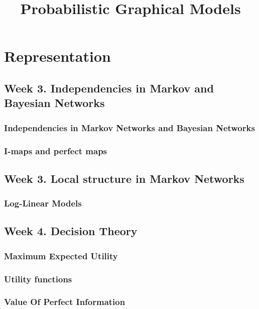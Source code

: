 \documentclass[a4paper,10pt]{article}
\title{Probabilistic Graphical Models}
\author{}
\begin{document}
\maketitle

\section{Representation}

\subsection{Week 3. Independencies in Markov and Bayesian Networks}

\subsubsection{Independencies in Markov Networks and Bayesian Networks}



\subsubsection{I-maps and perfect maps}



\subsection{Week 3. Local structure in Markov Networks}

\subsubsection{Log-Linear Models}




\subsection{Week 4. Decision Theory}

\subsubsection{Maximum Expected Utility}



\subsubsection{Utility functions}




\subsubsection{Value Of Perfect Information}


\end{document}
